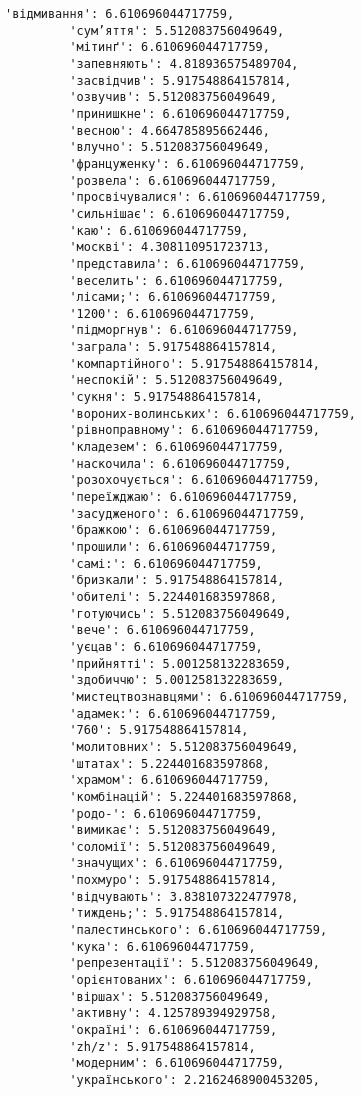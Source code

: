 \documentclass[11pt]{article}
\begin{document}
\begin{Verbatim}[commandchars=\\\{\}]
         'відмивання': 6.610696044717759,
         'сум’яття': 5.512083756049649,
         'мітинґ': 6.610696044717759,
         'запевняють': 4.818936575489704,
         'засвідчив': 5.917548864157814,
         'озвучив': 5.512083756049649,
         'принишкне': 6.610696044717759,
         'весною': 4.664785895662446,
         'влучно': 5.512083756049649,
         'француженку': 6.610696044717759,
         'розвела': 6.610696044717759,
         'просвічувалися': 6.610696044717759,
         'сильнішає': 6.610696044717759,
         'каю': 6.610696044717759,
         'москві': 4.308110951723713,
         'представила': 6.610696044717759,
         'веселить': 6.610696044717759,
         'лісами;': 6.610696044717759,
         '1200': 6.610696044717759,
         'підморгнув': 6.610696044717759,
         'заграла': 5.917548864157814,
         'компартійного': 5.917548864157814,
         'неспокій': 5.512083756049649,
         'сукня': 5.917548864157814,
         'вороних-волинських': 6.610696044717759,
         'рівноправному': 6.610696044717759,
         'кладезем': 6.610696044717759,
         'наскочила': 6.610696044717759,
         'розохочується': 6.610696044717759,
         'переїжджаю': 6.610696044717759,
         'засудженого': 6.610696044717759,
         'бражкою': 6.610696044717759,
         'прошили': 6.610696044717759,
         'самі:': 6.610696044717759,
         'бризкали': 5.917548864157814,
         'обителі': 5.224401683597868,
         'готуючись': 5.512083756049649,
         'вече': 6.610696044717759,
         'уєцав': 6.610696044717759,
         'прийнятті': 5.001258132283659,
         'здобиччю': 5.001258132283659,
         'мистецтвознавцями': 6.610696044717759,
         'адамек:': 6.610696044717759,
         '760': 5.917548864157814,
         'молитовних': 5.512083756049649,
         'штатах': 5.224401683597868,
         'храмом': 6.610696044717759,
         'комбінацій': 5.224401683597868,
         'родо-': 6.610696044717759,
         'вимикає': 5.512083756049649,
         'соломії': 5.512083756049649,
         'значущих': 6.610696044717759,
         'похмуро': 5.917548864157814,
         'відчувають': 3.838107322477978,
         'тиждень;': 5.917548864157814,
         'палестинського': 6.610696044717759,
         'кука': 6.610696044717759,
         'репрезентації': 5.512083756049649,
         'орієнтованих': 6.610696044717759,
         'віршах': 5.512083756049649,
         'активну': 4.125789394929758,
         'окраїні': 6.610696044717759,
         'zh/z': 5.917548864157814,
         'модерним': 6.610696044717759,
         'українського': 2.2162468900453205,

\end{Verbatim}
\end{document}
